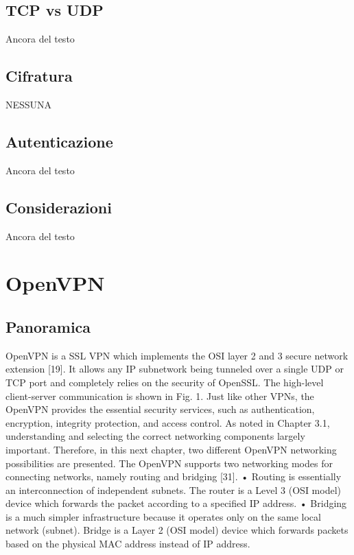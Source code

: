 \subsection{TCP vs UDP}
Ancora del testo

\subsection{Cifratura}
NESSUNA

\subsection{Autenticazione}
Ancora del testo

\subsection{Considerazioni}
Ancora del testo

\section{OpenVPN}
\subsection{Panoramica}
OpenVPN is a SSL VPN which implements the OSI layer 2 and 3 secure network extension [19]. It allows any IP subnetwork being tunneled over a single UDP or TCP port and completely relies on the security of OpenSSL. The high-level client-server communication is shown in Fig. 1. Just like other VPNs, the OpenVPN provides the essential security services, such as authentication, encryption, integrity protection, and access control.
As noted in Chapter 3.1, understanding and selecting the correct networking components largely important. Therefore, in this next chapter, two different OpenVPN networking possibilities are presented.
The OpenVPN supports two networking modes for connecting networks, namely routing and bridging [31].
• Routing is essentially an interconnection of independent subnets. The router is a Level 3 (OSI model) device which forwards the packet according to a specified IP address.
• Bridging is a much simpler infrastructure because it operates only on the same local network (subnet). Bridge is a Layer 2 (OSI model) device which forwards packets based on the physical MAC address instead of IP address.


